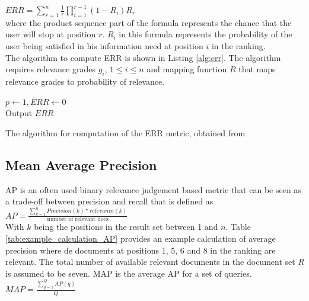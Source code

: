 $ERR = \sum\nolimits_{r=1}^n \frac{1}{r} \prod\nolimits_{i=1}^{r-1}(1-R_i)R_r$\\

where the product sequence part of the formula represents the chance that the user will stop at position $r$. $R_i$ in this formula represents the probability of the user being satisfied in his information need at position $i$ in the ranking.\\

The algorithm to compute \ac{ERR} is shown in Listing \ref{alg:err}. The algorithm requires relevance grades $g_i$, $1 \le i \le n$ and mapping function $R$ that maps relevance grades to probability of relevance.

\LinesNumbered
\begin{algorithm}[H]
 $p \leftarrow 1, ERR \leftarrow 0$\\
 Output $ERR$
 \caption{The algorithm for computation of the \acs{ERR} metric, obtained from \cite{Chapelle2009}}
 \label{alg:err}
\end{algorithm}

\subsection{Mean Average Precision}
\ac{AP} \cite{Zhu2004} is an often used binary relevance judgement based metric that can be seen as a trade-off between precision and recall that is defined as\\

$AP = \frac{\sum\nolimits_{k=1}^{n}Precision(k)*relevance(k)}{\text{number of relevant docs}}$\\

With $k$ being the positions in the result set between 1 and $n$. Table \ref{tab:example_calculation_AP} provides an example calculation of average precision where de documents at positions 1, 5, 6 and 8 in the ranking are relevant. The total number of available relevant documents in the document set \emph{R} is assumed to be seven.
\ac{MAP} is the average \ac{AP} for a set of queries.\\

$MAP = \frac{\sum\nolimits_{q=1}^{Q}AP(q)}{Q}$\\

